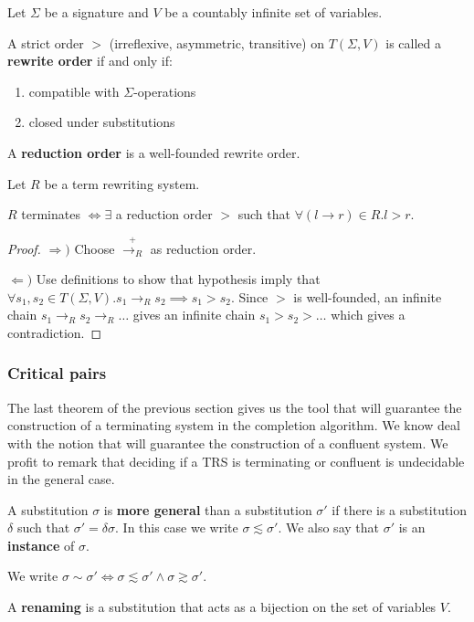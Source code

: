 \begin{definition}
Let $\Sigma$ be a signature and $V$ be a countably infinite set of variables. 

A strict order $>$ (irreflexive, asymmetric, transitive) on $T(\Sigma,V)$ is called a \textbf{rewrite order} if and only if:

\begin{enumerate}
\item compatible with $\Sigma$-operations
\item closed under substitutions
\end{enumerate}

A \textbf{reduction order} is a well-founded rewrite order.
\end{definition}

\begin{theorem}
Let $R$ be a term rewriting system. 

$R$ terminates $\iff \exists$ a reduction order $>$ such that $\forall (l \to r) \in R.l > r$. 
\end{theorem}
\begin{proof}
$\Rightarrow)$ Choose $\stackrel{+}{\to_R}$ as reduction order.

$\Leftarrow)$ Use definitions to show that hypothesis imply that $\forall s_1,s_2 \in T(\Sigma,V).s_1 \to_R s_2 \implies s_1 > s_2$. Since $>$ is well-founded, an infinite chain $s_1 \to_R s_2 \to_R \ldots$ gives an infinite chain $s_1 > s_2 > \ldots$ which gives a contradiction.
\end{proof}

\subsubsection{Critical pairs}

The last theorem of the previous section gives us the tool that will guarantee the construction of a terminating system in the completion algorithm. We know deal with the notion that will guarantee the construction of a confluent system. We profit to remark that deciding if a TRS is terminating or confluent is undecidable in the general case. 


\begin{definition}
A substitution $\sigma$ is \textbf{more general} than a substitution $\sigma'$ if there is a substitution $\delta$ such that $\sigma' = \delta \sigma$. In this case we write $\sigma \lesssim \sigma'$. We also say that $\sigma'$ is an \textbf{instance} of $\sigma$. 

We write $\sigma \sim \sigma' \iff \sigma \lesssim \sigma' \land \sigma \gtrsim \sigma'$. 

A \textbf{renaming} is a substitution that acts as a bijection on the set of variables $V$. 
\end{definition}


